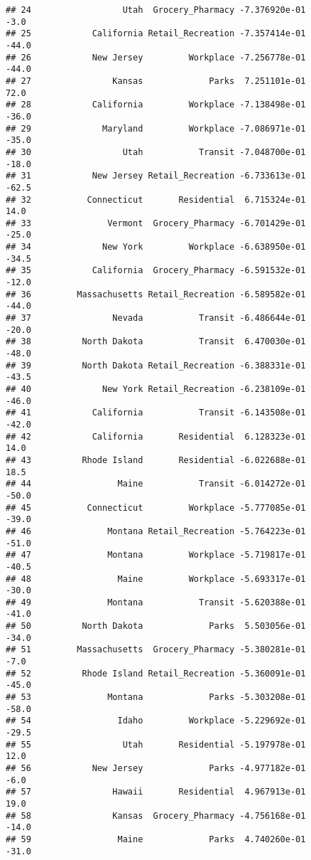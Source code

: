 \documentclass[]{article}
\begin{document}
\begin{verbatim}
## 24                  Utah  Grocery_Pharmacy -7.376920e-01          -3.0
## 25            California Retail_Recreation -7.357414e-01         -44.0
## 26            New Jersey         Workplace -7.256778e-01         -44.0
## 27                Kansas             Parks  7.251101e-01          72.0
## 28            California         Workplace -7.138498e-01         -36.0
## 29              Maryland         Workplace -7.086971e-01         -35.0
## 30                  Utah           Transit -7.048700e-01         -18.0
## 31            New Jersey Retail_Recreation -6.733613e-01         -62.5
## 32           Connecticut       Residential  6.715324e-01          14.0
## 33               Vermont  Grocery_Pharmacy -6.701429e-01         -25.0
## 34              New York         Workplace -6.638950e-01         -34.5
## 35            California  Grocery_Pharmacy -6.591532e-01         -12.0
## 36         Massachusetts Retail_Recreation -6.589582e-01         -44.0
## 37                Nevada           Transit -6.486644e-01         -20.0
## 38          North Dakota           Transit  6.470030e-01         -48.0
## 39          North Dakota Retail_Recreation -6.388331e-01         -43.5
## 40              New York Retail_Recreation -6.238109e-01         -46.0
## 41            California           Transit -6.143508e-01         -42.0
## 42            California       Residential  6.128323e-01          14.0
## 43          Rhode Island       Residential -6.022688e-01          18.5
## 44                 Maine           Transit -6.014272e-01         -50.0
## 45           Connecticut         Workplace -5.777085e-01         -39.0
## 46               Montana Retail_Recreation -5.764223e-01         -51.0
## 47               Montana         Workplace -5.719817e-01         -40.5
## 48                 Maine         Workplace -5.693317e-01         -30.0
## 49               Montana           Transit -5.620388e-01         -41.0
## 50          North Dakota             Parks  5.503056e-01         -34.0
## 51         Massachusetts  Grocery_Pharmacy -5.380281e-01          -7.0
## 52          Rhode Island Retail_Recreation -5.360091e-01         -45.0
## 53               Montana             Parks -5.303208e-01         -58.0
## 54                 Idaho         Workplace -5.229692e-01         -29.5
## 55                  Utah       Residential -5.197978e-01          12.0
## 56            New Jersey             Parks -4.977182e-01          -6.0
## 57                Hawaii       Residential  4.967913e-01          19.0
## 58                Kansas  Grocery_Pharmacy -4.756168e-01         -14.0
## 59                 Maine             Parks  4.740260e-01         -31.0

\end{verbatim}
\end{document}

